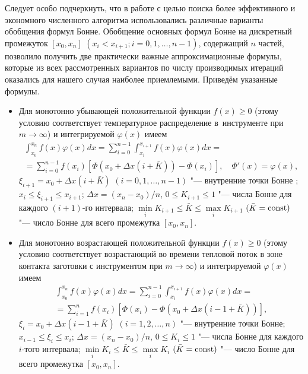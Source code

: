 Следует особо подчеркнуть, что в работе с целью поиска более
эффективного и экономного численного алгоритма использовались
различные варианты обобщения формул Бонне. Обобщение основных
формул Бонне \cite{stulin:bib10} на дискретный промежуток $[x_0, x_n ]$ $(x_i<x_{i+1}; i=0, 1, \ldots, n-1)$, содержащий $n$ частей, позволило получить две практически важные
аппроксимационные формулы, которые из всех рассмотренных вариантов
по числу производимых итераций оказались для нашего случая
наиболее приемлемыми. Приведём указанные формулы.

\begin{itemize}
\item[1.] Для монотонно убывающей положительной функции $f(x)\ge 0$ (этому условию соответствует температурное распределение в~инструменте при \mbox{$m\to \infty $}) и интегрируемой $\varphi (x)$ имеем
\begin{multline}
\label{stulin:eq7}
  \int_{x_0 }^{x_n } f(x)\varphi (x)dx=
\sum\limits_{i=0}^{n-1}  \int_{x_i }^{x_{i+1} } f(x)\varphi
(x)dx  = \\ =\sum\limits_{i=0}^{n-1} f(x_i )\left[ \Phi (x_0
+\Delta x(i+\bar {K}))-\Phi (x_i ) \right],\quad  \Phi
'(x)=\varphi (x),
\end{multline}
$\xi_{i+1}=x_0+\Delta x(i+\bar{K})$  $(i=0, 1, \ldots, n-1)$ "---
внутренние точки Бонне \cite{stulin:bib10}; $x_i \le \xi _{i+1} \le x_{i+1}$;
$\Delta x=(x_n -x_0 )/n$, $0\le K_{i+1} \le 1$ "--- числа Бонне для каждого
$(i+1)$-го интервала; $ \mathop{\min}\limits_i K_{i+1} \le \bar
K \le \mathop{\max}\limits_i K_{i+1}$ $(\bar {K}={\rm const})$
"--- число Бонне для всего промежутка $[x_0, x_n ]$.

\item[2.] Для монотонно возрастающей положительной функции $f(x)\ge 0$
(этому условию соответствует возрастающий во времени тепловой
поток в зоне контакта заготовки с инструментом при $m\to \infty$)
и интегрируемой $\varphi (x)$ имеем
\begin{multline}
\label{stulin:eq8}
  \int_{x_0}^{x_n} f(x)\varphi (x)dx=
\sum\limits_{i=0}^{n-1} \int_{x_i }^{x_{i+1}} f(x)\varphi
(x)dx =\\= \sum\limits_{i=1}^n f(x_i)\left[\Phi (x_i )-\Phi (x_0
+\Delta x(i-1+\bar {K})) \right],
\end{multline}
$\xi_i=x_0+\Delta x(i-1+\bar{K})$
$(i=1, 2, \ldots, n)$ "--- внутренние точки Бонне; $x_{i-1} \le \xi _i \le x_i$; $\Delta x=(x_n -x_0
)/n$, $0\le K_i \le 1$ "--- числа Бонне для каждого
$i$-того интервала; $\mathop {\min}\limits_i K_i \le \bar 
K \le \mathop {\max}\limits_i K_i$ $(\bar {K}={\rm const})$ "--- число Бонне для всего промежутка $[x_0, x_n ]$.


\end{itemize}

